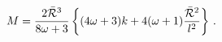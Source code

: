\begin{equation}\label{Mstatic}
M = {{2 \bar{\cal R}^3 } \over {8\omega + 3}} \left\{ (4\omega +3) k +
  4 (\omega+1) {{\bar{\cal R}^2}\over l^2} \right\} \, .
\end{equation}

